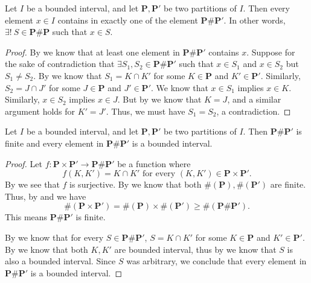 \begin{ac}\label{i:ac:11.1.2}
  Let \(I\) be a bounded interval, and let \(\mathbf{P}, \mathbf{P}'\) be two partitions of \(I\).
  Then every element \(x \in I\) contains in exactly one of the element \(\mathbf{P} \# \mathbf{P}'\).
  In other words, \(\exists!\ S \in \mathbf{P} \# \mathbf{P}\) such that \(x \in S\).
\end{ac}

\begin{proof}
  By  we know that at least one element in \(\mathbf{P} \# \mathbf{P}'\) contains \(x\).
  Suppose for the sake of contradiction that \(\exists S_1, S_2 \in \mathbf{P} \# \mathbf{P}'\) such that \(x \in S_1\) and \(x \in S_2\) but \(S_1 \neq S_2\).
  By  we know that \(S_1 = K \cap K'\) for some \(K \in \mathbf{P}\) and \(K' \in \mathbf{P}'\).
  Similarly, \(S_2 = J \cap J'\) for some \(J \in \mathbf{P}\) and \(J' \in \mathbf{P}'\).
  We know that \(x \in S_1\) implies \(x \in K\).
  Similarly, \(x \in S_2\) implies \(x \in J\).
  But by  we know that \(K = J\), and a similar argument holds for \(K' = J'\).
  Thus, we must have \(S_1 = S_2\), a contradiction.
\end{proof}

\begin{ac}\label{i:ac:11.1.3}
  Let \(I\) be a bounded interval, and let \(\mathbf{P}, \mathbf{P}'\) be two partitions of \(I\).
  Then \(\mathbf{P} \# \mathbf{P}'\) is finite and every element in \(\mathbf{P} \# \mathbf{P}'\) is a bounded interval.
\end{ac}

\begin{proof}
  Let \(f : \mathbf{P} \times \mathbf{P}' \to \mathbf{P} \# \mathbf{P}'\) be a function where
  \[
    f(K, K') = K \cap K' \text{ for every } (K, K') \in \mathbf{P} \times \mathbf{P}'.
  \]
  By  we see that \(f\) is surjective.
  By  we know that both \(\#(\mathbf{P}), \#(\mathbf{P}')\) are finite.
  Thus, by  and  we have
  \[
    \#(\mathbf{P} \times \mathbf{P}') = \#(\mathbf{P}) \times \#(\mathbf{P}') \geq \#(\mathbf{P} \# \mathbf{P}').
  \]
  This means \(\mathbf{P} \# \mathbf{P}'\) is finite.

  By  we know that for every \(S \in \mathbf{P} \# \mathbf{P}'\), \(S = K \cap K'\) for some \(K \in \mathbf{P}\) and \(K' \in \mathbf{P}'\).
  By  we know that both \(K, K'\) are bounded interval, thus by  we know that \(S\) is also a bounded interval.
  Since \(S\) was arbitrary, we conclude that every element in \(\mathbf{P} \# \mathbf{P}'\) is a bounded interval.
\end{proof}

